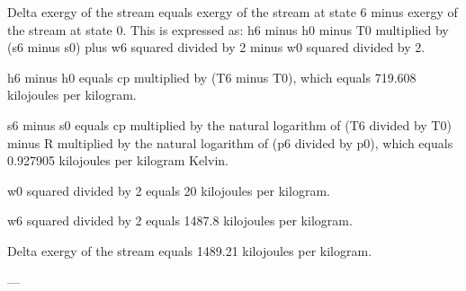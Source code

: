 Delta exergy of the stream equals exergy of the stream at state 6 minus exergy of the stream at state 0. This is expressed as:  
h6 minus h0 minus T0 multiplied by (s6 minus s0) plus w6 squared divided by 2 minus w0 squared divided by 2.  

h6 minus h0 equals cp multiplied by (T6 minus T0), which equals 719.608 kilojoules per kilogram.  

s6 minus s0 equals cp multiplied by the natural logarithm of (T6 divided by T0) minus R multiplied by the natural logarithm of (p6 divided by p0), which equals 0.927905 kilojoules per kilogram Kelvin.  

w0 squared divided by 2 equals 20 kilojoules per kilogram.  

w6 squared divided by 2 equals 1487.8 kilojoules per kilogram.  

Delta exergy of the stream equals 1489.21 kilojoules per kilogram.  

---